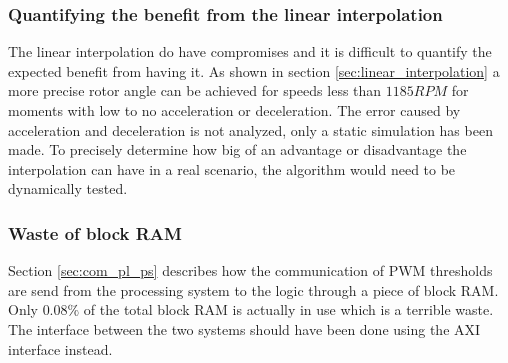 \subsubsection{Quantifying the benefit from the linear interpolation}
The linear interpolation do have compromises and it is difficult to quantify the expected benefit from having it. As shown in section \ref{sec:linear_interpolation} a more precise rotor angle can be achieved for speeds less than $1185RPM$ for moments with low to no acceleration or deceleration. The error caused by acceleration and deceleration is not analyzed, only a static simulation has been made. To precisely determine how big of an advantage or disadvantage the interpolation can have in a real scenario, the algorithm would need to be dynamically tested.

\subsubsection{Waste of block RAM}
Section \ref{sec:com_pl_ps} describes how the communication of PWM thresholds are send from the processing system to the logic through a piece of block RAM. Only $0.08\%$ of the total block RAM is actually in use which is a terrible waste. The interface between the two systems should have been done using the AXI interface instead.


 
 